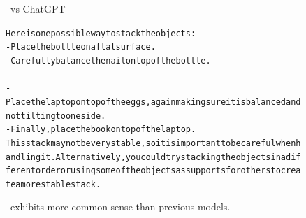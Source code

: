\begin{figure}
\begin{AIbox}{\DV\ vs ChatGPT}
{\begin{alltt}
Here is one possible way to stack the objects:\\

- Place the bottle on a flat surface.\\
- Carefully balance the nail on top of the bottle.\\
- \\
- Place the laptop on top of the eggs, again making sure it is balanced and not tilting to one side.\\
- Finally, place the book on top of the laptop.\\

This stack may not be very stable, so it is important to be careful when handling it. Alternatively, you could try stacking the objects in a different order or using some of the objects as supports for others to create a more stable stack.
\end{alltt}}
\end{AIbox}
\caption{\DV\ exhibits more common sense than previous models.}\label{fig:commonsense1}
\end{figure}

